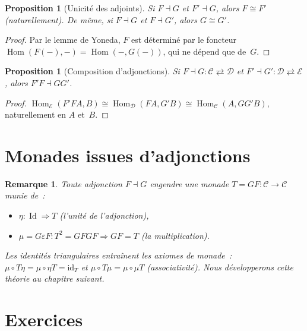 \documentclass[a4paper,12pt]{book}
\DeclareMathOperator{\Hom}{Hom}
\DeclareMathOperator{\Id}{Id}
\newcommand{\id}{\mathrm{id}}
\newtheorem{proposition}[theoreme]{Proposition}
\newtheorem*{remarque}{Remarque}
\begin{document}
\begin{proposition}[Unicité des adjoints]\label{prop:unicite-adjoints}
Si $F\dashv G$ et $F'\dashv G$, alors $F\cong F'$ (naturellement).
De même, si $F\dashv G$ et $F\dashv G'$, alors $G\cong G'$.
\end{proposition}

\begin{proof}
Par le lemme de Yoneda, $F$ est déterminé par le foncteur
$\Hom(F(-),-)=\Hom(-,G(-))$, qui ne dépend que de~$G$.
\end{proof}

\begin{proposition}[Composition d'adjonctions]\label{prop:composition-adj}
Si $F\dashv G\colon\mathcal{C}\rightleftarrows\mathcal{D}$ et
$F'\dashv G'\colon\mathcal{D}\rightleftarrows\mathcal{E}$, alors
$F'F\dashv GG'$.
\end{proposition}

\begin{proof}
$\Hom_\mathcal{E}(F'FA,B)
\cong\Hom_\mathcal{D}(FA,G'B)
\cong\Hom_\mathcal{C}(A,GG'B)$,
naturellement en $A$ et~$B$.
\end{proof}


\section{Monades issues d'adjonctions}\label{sec:monades-apercu}

\begin{remarque}\label{rem:monade-apercu}
Toute adjonction $F\dashv G$ engendre une \emph{monade}
$T = GF\colon\mathcal{C}\to\mathcal{C}$ munie de~:
\begin{itemize}
\item $\eta\colon\Id\Rightarrow T$ (l'unité de l'adjonction),
\item $\mu = G\varepsilon F\colon T^2 = GFGF\Rightarrow GF = T$
      (la multiplication).
\end{itemize}
Les identités triangulaires entraînent les axiomes de monade~:
$\mu\circ T\eta = \mu\circ\eta T = \id_T$ et
$\mu\circ T\mu = \mu\circ\mu T$ (associativité).
Nous développerons cette théorie au chapitre suivant.
\end{remarque}


\section{Exercices}\label{sec:exo-adjonctions}
\end{document}
